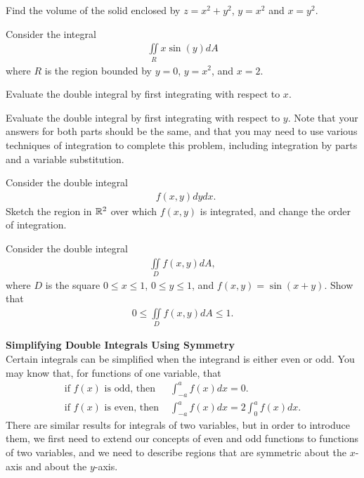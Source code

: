 \documentclass{article}
\begin{document}
\item %
Find the volume of the solid enclosed by $z = x^2 + y^2$, $y = x^2$ and $x=y^2$.
\item %
Consider the integral
\begin{align*}
  \iint\limits_R x\sin(y) dA
\end{align*}
 where $R$ is the region bounded by $y=0$, $y=x^2$, and $x=2$.
\BEN
\item Evaluate the double integral by first integrating with respect to $x$. 
\item Evaluate the double integral by first integrating with respect to $y$. 
\EEN
Note that your answers for both parts should be the same, and that you may need to use various techniques of integration to complete this problem, including integration by parts and a variable substitution. 
\item %
Consider the double integral
\begin{align*}
  \mathop{\int_{0}^{1+e} \! \int_0^{\ln(x-1)}} f(x,y) dydx .
\end{align*}
Sketch the region in $\mathbb{R}^2$ over which $f(x,y)$ is integrated, and change the order of integration.  
\item %
Consider the double integral
\begin{align*}
  \iint\limits_D f(x,y) dA,
\end{align*}
where $D$ is the square $0\le x \le 1$, $0\le y \le 1$, and $f(x,y) = \sin(x+y)$. Show that 
\begin{align*}
  0 \le \iint\limits_D f(x,y) dA \le 1.
\end{align*}
\item %
\textbf{Simplifying Double Integrals Using Symmetry} \\
Certain integrals can be simplified when the integrand is either even or odd. You may know that, for functions of one variable, that
\begin{align*}
  \text{if }f(x)\text{ is odd, then } & \int_{-a}^{a} f(x) dx = 0 . \\
  \text{if }f(x)\text{ is even, then } & \int_{-a}^{a} f(x) dx = 2 \int_0^a f(x) dx.
\end{align*}
There are similar results for integrals of two variables, but in order to introduce them, we first need to extend our concepts of even and odd functions to functions of two variables, and we need to describe regions that are symmetric about the $x$-axis and about the $y$-axis. 
\end{document}
